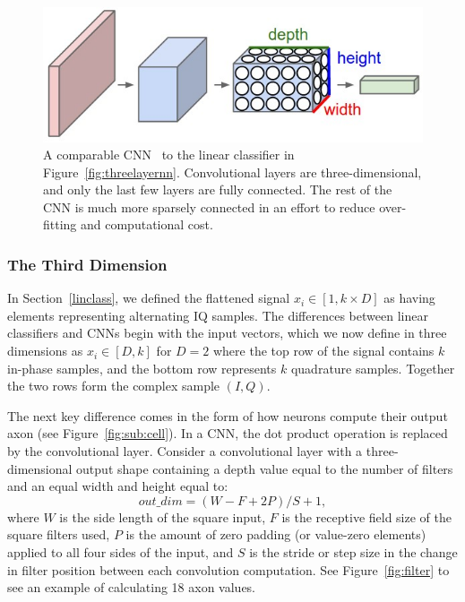 \begin{figure}[ht!]
	\centering	\includegraphics[width=1\textwidth,keepaspectratio]{figs/cnn.jpeg}
    \caption{A comparable CNN~\cite{cs231} to the linear classifier in Figure~\ref{fig:threelayernn}. Convolutional layers are three-dimensional, and only the last few layers are fully connected. The rest of the CNN is much  more sparsely connected in an effort to reduce over-fitting and computational cost.}
\label{fig:cnn}      
\end{figure}\FloatBarrier

\subsubsection{The Third Dimension}
In Section~\ref{linclass}, we defined the flattened signal $x_i \in [ 1,k \times D ]$ as having elements representing alternating IQ samples. The differences between linear classifiers and CNNs begin with the input vectors, which we now define in three dimensions as $x_i \in [ D, k ]$ for $D=2$ where the top row of the signal contains $k$ in-phase samples, and the bottom row represents $k$ quadrature samples. Together the two rows form the complex sample $(I, Q)$.

The next key difference comes in the form of how neurons compute their output axon (see Figure~\ref{fig:sub:cell}). In a CNN, the dot product operation is replaced by the convolutional layer. Consider a convolutional layer with a three-dimensional output shape containing a depth value equal to the number of filters and an equal width and height equal to:
\begin{equation}
\label{eq:outsize}
out\_dim = (W-F+2P)/S + 1,
\end{equation}
where $W$ is the side length of the square input, $F$ is the receptive field size of the square filters used, $P$ is the amount of zero padding (or value-zero elements) applied to all four sides of the input, and $S$ is the stride or step size in the change in filter position between each convolution computation. See Figure~\ref{fig:filter} to see an example of calculating 18 axon values.

